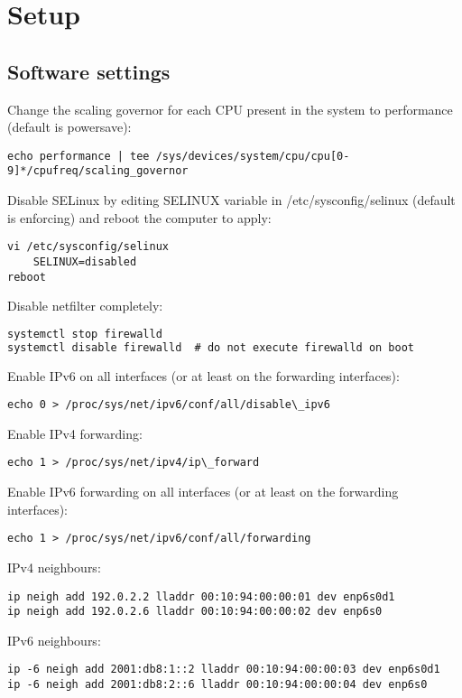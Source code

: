 
\chapter{Setup}\label{chap:setup}







\section{Software settings}
Change the scaling governor for each CPU present in the system to performance (default is powersave):
\begin{lstlisting}
echo performance | tee /sys/devices/system/cpu/cpu[0-9]*/cpufreq/scaling_governor
\end{lstlisting}
Disable SELinux by editing SELINUX variable in /etc/sysconfig/selinux
(default is enforcing) and reboot the computer to apply:
\begin{lstlisting}
vi /etc/sysconfig/selinux
	SELINUX=disabled
reboot
\end{lstlisting}
Disable netfilter completely:
\begin{lstlisting}[language=TeX]
systemctl stop firewalld
systemctl disable firewalld  # do not execute firewalld on boot
\end{lstlisting}
Enable IPv6 on all interfaces (or at least on the forwarding interfaces):
\begin{lstlisting}
echo 0 > /proc/sys/net/ipv6/conf/all/disable\_ipv6
\end{lstlisting}
Enable IPv4 forwarding:
\begin{lstlisting}
echo 1 > /proc/sys/net/ipv4/ip\_forward
\end{lstlisting}
Enable IPv6 forwarding on all interfaces (or at least on the forwarding interfaces):
\begin{lstlisting}
echo 1 > /proc/sys/net/ipv6/conf/all/forwarding
\end{lstlisting}

IPv4 neighbours:
\begin{lstlisting}
ip neigh add 192.0.2.2 lladdr 00:10:94:00:00:01 dev enp6s0d1
ip neigh add 192.0.2.6 lladdr 00:10:94:00:00:02 dev enp6s0
\end{lstlisting}
IPv6 neighbours:
\begin{lstlisting}
ip -6 neigh add 2001:db8:1::2 lladdr 00:10:94:00:00:03 dev enp6s0d1
ip -6 neigh add 2001:db8:2::6 lladdr 00:10:94:00:00:04 dev enp6s0
\end{lstlisting}

